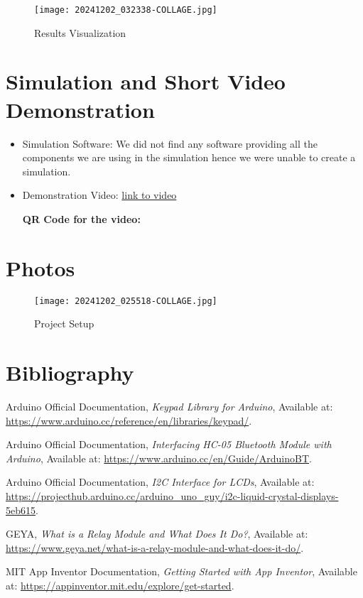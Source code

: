 \documentclass[a4paper, 12pt]{article}
\begin{document}
\begin{figure}[H]
    \centering
    \texttt{[image: 20241202\_032338-COLLAGE.jpg]}
    \caption{Results Visualization}
\end{figure}

\section{Simulation and Short Video Demonstration}
\begin{itemize}
    \item Simulation Software: We did not find any software providing all the components we are using in the simulation hence we were unable to create a simulation. 
    \item Demonstration Video: \href{https://iiitaphyd-my.sharepoint.com/:v:/g/personal/harry_jain_research_iiit_ac_in/EdGUeO9bXKJGoRh8uWHGxhgBBLm3FiaC0rY1k3uBpZZm1g?e=NOyhcC}{link to video}
    \begin{center}
        \textbf{QR Code for the video:}
        \\
        \vspace{1em}
    \end{center}
\end{itemize}

\section{Photos}
\begin{figure}[H]
    \centering
    \texttt{[image: 20241202\_025518-COLLAGE.jpg]}
    \caption{Project Setup}
\end{figure}

\section{Bibliography}
\begin{thebibliography}{9}
    Arduino Official Documentation, \textit{Keypad Library for Arduino}, Available at: \url{https://www.arduino.cc/reference/en/libraries/keypad/}.
    
    Arduino Official Documentation, \textit{Interfacing HC-05 Bluetooth Module with Arduino}, Available at: \url{https://www.arduino.cc/en/Guide/ArduinoBT}.
    
    Arduino Official Documentation, \textit{I2C Interface for LCDs}, Available at: \url{https://projecthub.arduino.cc/arduino_uno_guy/i2c-liquid-crystal-displays-5eb615}.
    
GEYA, \textit{What is a Relay Module and What Does It Do?}, Available at: \url{https://www.geya.net/what-is-a-relay-module-and-what-does-it-do/}.

    MIT App Inventor Documentation, \textit{Getting Started with App Inventor}, Available at: \url{https://appinventor.mit.edu/explore/get-started}.
\end{thebibliography}
\end{document}
